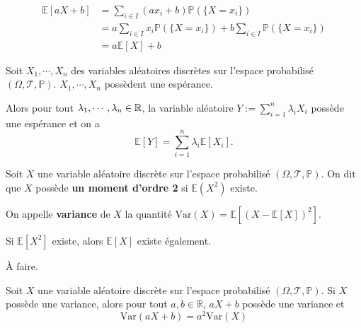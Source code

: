 \documentclass[a4paper,12pt]{article}
\begin{document}
\begin{demonstration}
    \begin{align*}
        \mathbb{E}[aX + b] &= \sum_{i \in I} (a x_i + b) \mathbb{P}(\{ X = x_i \}) \\
        &= a \sum_{i \in I} x_i \mathbb{P}(\{ X = x_i \}) + b \sum_{i \in I} \mathbb{P}(\{ X = x_i \}) \\
        &= a \mathbb{E}[X] + b
    \end{align*}
\end{demonstration}

\begin{corollaire}{}{}
    Soit $X_1, \cdots, X_n$ des variables aléatoires discrètes sur l'espace probabilisé $(\Omega, \mathcal{T}, \mathbb{P})$.
    $X_1, \cdots, X_n$ possèdent une espérance.

    Alors pour tout $\lambda_1, \cdots, \lambda_n \in \mathbb{R}$, la variable aléatoire $Y:= \sum_{i=1}^n \lambda_i X_i$ possède une espérance et on a
    $$
    \mathbb{E}[Y] = \sum_{i=1}^n \lambda_i \mathbb{E}[X_i].
    $$
\end{corollaire}

\begin{demonstration}
\end{demonstration}

\clearpage

\begin{definition}
    Soit $X$ une variable aléatoire discrète sur l'espace probabilisé $(\Omega, \mathcal{T}, \mathbb{P})$.
    On dit que $X$ possède \textbf{un moment d'ordre 2} si $\mathbb{E}(X^2)$ existe.

    On appelle \textbf{variance} de $X$ la quantité $\mathrm{Var}(X) = \mathbb{E}[(X - \mathbb{E}[X])^2]$.
\end{definition}

\begin{proposition}{}{}
    Si $\mathbb{E}[X^2]$ existe, alors $\mathbb{E}[X]$ existe également.
\end{proposition}

\begin{demonstration}
    À faire.
\end{demonstration}

\begin{proposition}{}{}
    Soit $X$ une variable aléatoire discrète sur l'espace probabilisé $(\Omega, \mathcal{T}, \mathbb{P})$.
    Si $X$ possède une variance, alors pour tout $a, b \in \mathbb{R}$, $aX + b$ possède une variance et
    $$
    \mathrm{Var}(aX + b) = a^2 \mathrm{Var}(X)
    $$
\end{proposition}
\end{document}
